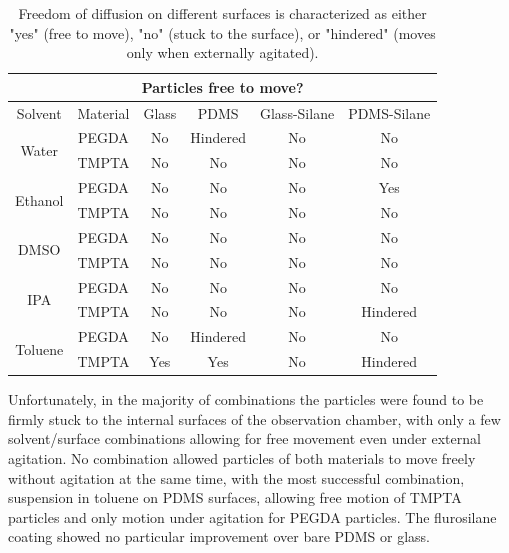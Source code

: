 \begin{table}[h]
\begin{center}

\begin{tabular}{| c | c | c | c | c | c |}

\hline

\multicolumn{6}{|c|}{Particles free to move?} \\ \hline
Solvent & Material & Glass & PDMS & Glass-Silane & PDMS-Silane \\ \hline

\multirow{2}{*}{Water} & PEGDA & No & Hindered & No & No \\
 & TMPTA & No & No & No & No \\ \hline

\multirow{2}{*}{Ethanol} & PEGDA & No & No & No & Yes \\
 & TMPTA & No & No & No & No \\ \hline

\multirow{2}{*}{DMSO} & PEGDA & No & No & No & No \\
 & TMPTA & No & No & No & No \\ \hline

\multirow{2}{*}{IPA} & PEGDA & No & No & No & No \\
 & TMPTA & No & No & No & Hindered \\ \hline

\multirow{2}{*}{Toluene} & PEGDA & No & Hindered & No & No \\
 & TMPTA & Yes & Yes & No & Hindered \\ \hline

\end{tabular}
\end{center}
\caption{Freedom of diffusion on different surfaces is characterized as either 
"yes" (free to move), "no" (stuck to the surface), or "hindered" (moves only when externally agitated).}
\label{tab:surface-diff}
\end{table}

Unfortunately, in the majority of combinations the particles were found to be firmly stuck to the
internal surfaces of the observation chamber, with only a few solvent/surface combinations allowing for 
free movement even under external agitation.  No combination allowed particles of both materials to move freely
without agitation at the same time, with the most successful combination, suspension in toluene 
on PDMS surfaces, allowing free motion of TMPTA particles and only motion under agitation for PEGDA
particles.  The flurosilane coating showed no particular improvement over bare PDMS or glass.

